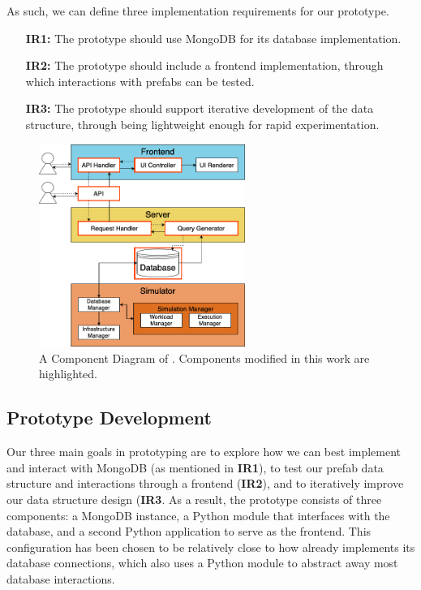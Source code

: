 \documentclass[11pt]{article}
\begin{document}
		As such, we can define three implementation requirements for our prototype.

		\begin{itemize}
			\item [\textbf{IR1:}] The prototype should use MongoDB for its database implementation.
			\item [\textbf{IR2:}] The prototype should include a frontend implementation, through which interactions with prefabs can be tested.
			\item [\textbf{IR3:}] The prototype should support iterative development of the data structure, through being lightweight enough for rapid experimentation.
			
		\end{itemize}

		\begin{figure}[h!]
			\centering
			\includegraphics[width=0.6\textwidth]{opendc-component-diagram.png}
			\caption[\opendc{} Component Diagram]{A Component Diagram of \opendc{}. Components modified in this work are highlighted.}
			\label{fig:componentdiagram}
		\end{figure}

	\subsection{Prototype Development}
		
		Our three main goals in prototyping are to explore how we can best implement and interact with MongoDB (as mentioned in \textbf{IR1}), to test our prefab data structure and interactions through a frontend (\textbf{IR2}), and to iteratively improve our data structure design (\textbf{IR3}.
		As a result, the prototype consists of three components: a MongoDB instance, a Python module that interfaces with the database, and a second Python application to serve as the frontend. 
		This configuration has been chosen to be relatively close to how \opendc{} already implements its database connections, which also uses a Python module to abstract away most database interactions.
\end{document}
